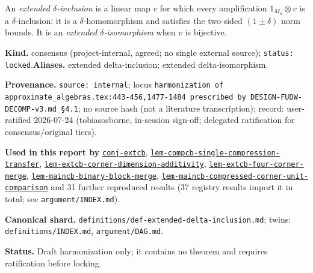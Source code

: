 \hypertarget{def:extended-delta-inclusion}{}%
\begin{definition}\label{def:extended-delta-inclusion}
An \emph{extended \(\delta\)-inclusion} is a linear map \(v\) for
which every amplification \(1_{M_n}\otimes v\) is a \(\delta\)-inclusion:
it is a \(\delta\)-homomorphism and satisfies the two-sided
\((1\pm\delta)\) norm bounds. It is an \emph{extended
\(\delta\)-isomorphism} when \(v\) is bijective.
\end{definition}
\begin{defnote}
\textbf{Kind.} consensus (project-internal, agreed; no single external source); \texttt{status: locked}.\quad\textbf{Aliases.} extended delta-inclusion; extended delta-isomorphism.
\par
\textbf{Provenance.} \texttt{source: internal}; locus \texttt{harmonization of approximate\_algebras.\allowbreak{}tex:\allowbreak{}443-\allowbreak{}456,\allowbreak{}1477-\allowbreak{}1484 prescribed by DESIGN-\allowbreak{}FUDW-\allowbreak{}DECOMP-\allowbreak{}v3.\allowbreak{}md \S{}4.\allowbreak{}1}; no source hash (not a literature transcription); record: user-\allowbreak{}ratified 2026-\allowbreak{}07-\allowbreak{}24 (tobiasosborne,\allowbreak{} in-\allowbreak{}session sign-\allowbreak{}off;\allowbreak{} delegated ratification for consensus/\allowbreak{}original tiers).
\par
\textbf{Used in this report by} \hyperref[conj:extcb]{\texttt{conj-\allowbreak{}extcb}}, \hyperref[lem:compcb-single-compression-transfer]{\texttt{lem-\allowbreak{}compcb-\allowbreak{}single-\allowbreak{}compression-\allowbreak{}transfer}}, \hyperref[lem:extcb-corner-dimension-additivity]{\texttt{lem-\allowbreak{}extcb-\allowbreak{}corner-\allowbreak{}dimension-\allowbreak{}additivity}}, \hyperref[lem:extcb-four-corner-merge]{\texttt{lem-\allowbreak{}extcb-\allowbreak{}four-\allowbreak{}corner-\allowbreak{}merge}}, \hyperref[lem:maincb-binary-block-merge]{\texttt{lem-\allowbreak{}maincb-\allowbreak{}binary-\allowbreak{}block-\allowbreak{}merge}}, \hyperref[lem:maincb-compressed-corner-unit-comparison]{\texttt{lem-\allowbreak{}maincb-\allowbreak{}compressed-\allowbreak{}corner-\allowbreak{}unit-\allowbreak{}comparison}} and 31 further reproduced results (37 registry results import it in total; see \texttt{argument/INDEX.md}).
\par
\textbf{Canonical shard.} \texttt{definitions/\allowbreak{}def-\allowbreak{}extended-\allowbreak{}delta-\allowbreak{}inclusion.\allowbreak{}md}; twins: \texttt{definitions/INDEX.md}, \texttt{argument/DAG.md}.
\par
\textbf{Status.} Draft harmonization only; it contains no theorem and requires
ratification before locking.


\end{defnote}
